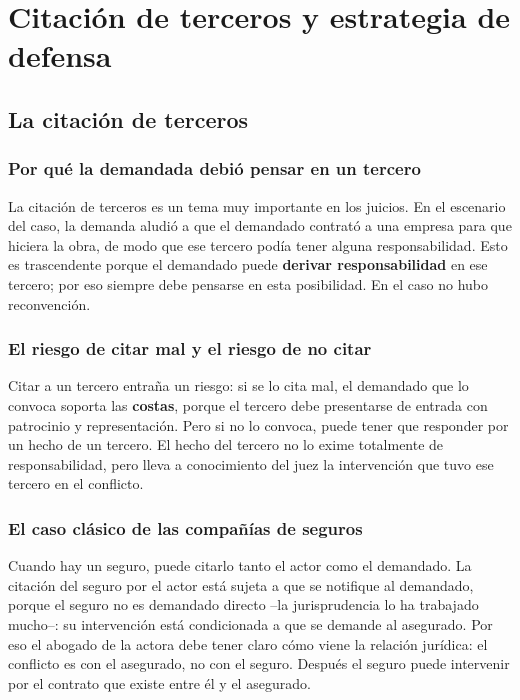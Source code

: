 \documentclass[12pt,oneside]{book}
\begin{document}
\chapter[Citaci\'on de terceros y estrategia]{Citaci\'on de terceros y estrategia de defensa}

\section{La citaci\'on de terceros}

\subsection{Por qu\'e la demandada debi\'o pensar en un tercero}

La citaci\'on de terceros es un tema muy importante en los juicios. En el escenario del caso, la demanda aludi\'o a que el demandado contrat\'o a una empresa para que hiciera la obra, de modo que ese tercero pod\'ia tener alguna responsabilidad. Esto es trascendente porque el demandado puede \textbf{derivar responsabilidad} en ese tercero; por eso siempre debe pensarse en esta posibilidad. En el caso no hubo reconvenci\'on.

\subsection{El riesgo de citar mal y el riesgo de no citar}

Citar a un tercero entra\~na un riesgo: si se lo cita mal, el demandado que lo convoca soporta las \textbf{costas}, porque el tercero debe presentarse de entrada con patrocinio y representaci\'on. Pero si no lo convoca, puede tener que responder por un hecho de un tercero. El hecho del tercero no lo exime totalmente de responsabilidad, pero lleva a conocimiento del juez la intervenci\'on que tuvo ese tercero en el conflicto.

\subsection{El caso cl\'asico de las compa\~n\'ias de seguros}

Cuando hay un seguro, puede citarlo tanto el actor como el demandado. La citaci\'on del seguro por el actor est\'a sujeta a que se notifique al demandado, porque el seguro no es demandado directo --la jurisprudencia lo ha trabajado mucho--: su intervenci\'on est\'a condicionada a que se demande al asegurado. Por eso el abogado de la actora debe tener claro c\'omo viene la relaci\'on jur\'idica: el conflicto es con el asegurado, no con el seguro. Despu\'es el seguro puede intervenir por el contrato que existe entre \'el y el asegurado.
\end{document}
